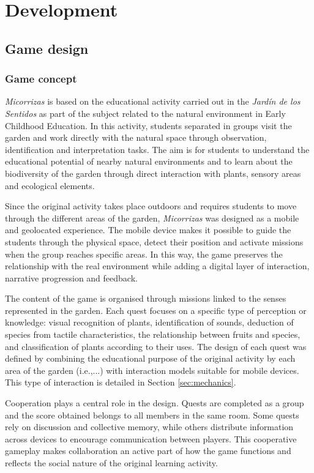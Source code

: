 \chapter{Development}

\section{Game design}

\subsection{Game concept}
\textit{Micorrizas} is based on the educational activity carried out in the \textit{Jardín de los Sentidos} as part of the subject related to the natural environment in Early Childhood Education. In this activity, students separated in groups visit the garden and work directly with the natural space through observation, identification and interpretation tasks. The aim is for students to understand the educational potential of nearby natural environments and to learn about the biodiversity of the garden through direct interaction with plants, sensory areas and ecological elements.

Since the original activity takes place outdoors and requires students to move through the different areas of the garden, \textit{Micorrizas} was designed as a mobile and geolocated experience. The mobile device makes it possible to guide the students through the physical space, detect their position and activate missions when the group reaches specific areas. In this way, the game preserves the relationship with the real environment while adding a digital layer of interaction, narrative progression and feedback.

The content of the game is organised through missions linked to the senses represented in the garden. Each quest focuses on a specific type of perception or knowledge: visual recognition of plants, identification of sounds, deduction of species from tactile characteristics, the relationship between fruits and species, and classification of plants according to their uses. The design of each quest was defined by combining the educational purpose of the original activity by each area of the garden (i.e.,...) with interaction models suitable for mobile devices. This type of interaction is detailed in Section \ref{sec:mechanics}.

Cooperation plays a central role in the design. Quests are completed as a group and the score obtained belongs to all members in the same room. Some quests rely on discussion and collective memory, while others distribute information across devices to encourage communication between players. This cooperative gameplay makes collaboration an active part of how the game functions and reflects the social nature of the original learning activity.

